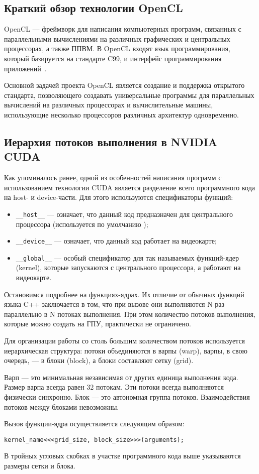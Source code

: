 \subsection{Краткий обзор технологии OpenCL}

OpenCL --- фреймворк для написания компьютерных программ, связанных
с параллельными вычислениями на различных графических и центральных
процессорах, а также ППВМ. В OpenCL входят язык программирования, который базируется на стандарте C99, и интерфейс программирования приложений~\cite{ruwiki:OpenCL}.

Основной задачей проекта OpenCL является создание и поддержка открытого стандарта, позволяющего создавать универсальные программы для параллельных вычислений на различных процессорах и вычислительные машины,
использующие несколько процессоров различных архитектур одновременно.

\subsection{Иерархия потоков выполнения в NVIDIA CUDA}

Как упоминалось ранее, одной из особенностей написания программ с использованием технологии CUDA является разделение всего программного кода
на host- и device-части. Для этого используются спецификаторы функций:
\begin{itemize}
\item \texttt{\_\_host\_\_} --- означает, что данный код предназначен для центрального процессора (используется по умолчанию );
\item \texttt{\_\_device\_\_} --- означает, что данный код работает на видеокарте;
\item \texttt{\_\_global\_\_} --- особый спецификатор для так называемых функций-ядер (kernel), которые запускаются с центрального процессора, а работают на видеокарте.
\end{itemize}

Остановимся подробнее на функциях-ядрах. Их отличие от обычных
функций языка C++ заключается в том, что при вызове они выполняются N раз
параллельно в N потоках выполнения. При этом количество потоков выполнения, которые можно создать на ГПУ, практически не ограничено.

Для организации работы со столь большим количеством потоков используется иерархическая структура: потоки объединяются в варпы (warp), варпы, в
свою очередь, --- в блоки (block), а блоки составляют сетку (grid).

Варп --- это минимальная независимая от других единица выполнения кода. Размер варпа всегда равен 32 потокам. Эти потоки всегда выполняются физически синхронно. Блок --- это автономная группа потоков. Взаимодействия
потоков между блоками невозможны.

Вызов функции-ядра осуществляется следующим образом:
\begin{verbatim}
kernel_name<<<grid_size, block_size>>>(arguments);
\end{verbatim}

В тройных угловых скобках в участке программного кода выше указываются размеры сетки и блока.